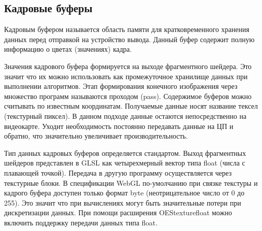 \subsection{Кадровые буферы}

Кадровым буфером называется область памяти для кратковременного хранения данных перед отправкой
на устройство вывода. Данный буфер содержит полную информацию о цветах (значениях) кадра.

Значения кадрового буфера формируется на выходе фрагментного шейдера. Это значит что их можно 
использовать как промежуточное хранилище данных при выполнении алгоритмов. Этап формирования 
конечного изображения через множество программ называются проходом (pass). Содержимое буферов 
можно считывать по известным координатам. Получаемые данные носят название тексел (текстурный 
пиксел). В данном подходе данные остаются непосредственно на видеокарте. Уходит необходимость
постоянно передавать данные на ЦП и обратно, что значительно увеличивает производительность.

Тип данных кадровых буферов определяется стандартом. Выход фрагментных шейдеров представлен в 
GLSL как четырехмерный вектор типа float (числа с плавающей точкой). Передача в другую программу
осуществляется через текстурные блоки. В спецификации WebGL по-умолчанию при связке текстуры
и кадрого буфера доступен только формат byte (неотрицательное число от 0 до 255). Это значит
что при вычислениях могут быть значительные потери при дискретизации данных. При помощи
расширения OES\textunderscore{}texture\textunderscore{}float можно включить поддержку передачи 
данных типа float.
